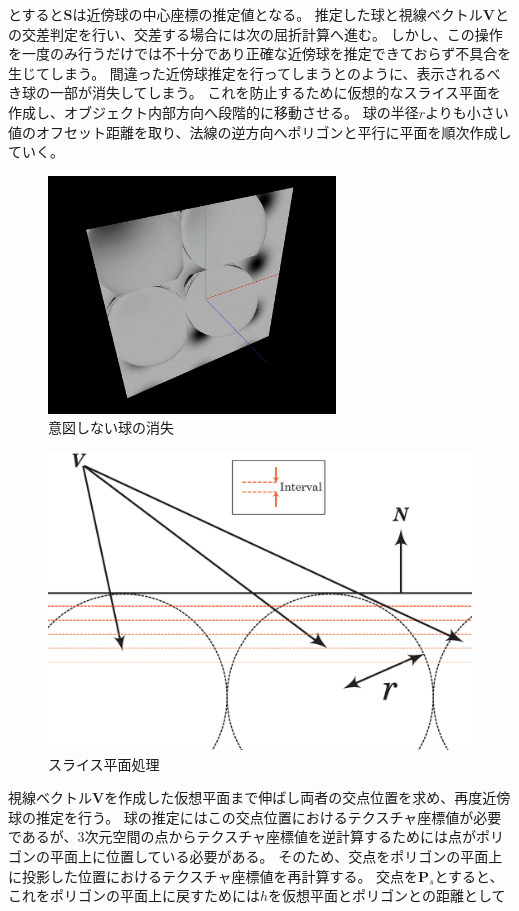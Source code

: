 \noindent
とすると$\bm{S}$は近傍球の中心座標の推定値となる。
推定した球と視線ベクトル$\bm{V}$との交差判定を行い、交差する場合には次の屈折計算へ進む。
しかし、この操作を一度のみ行うだけでは不十分であり正確な近傍球を推定できておらず不具合を生じてしまう。
間違った近傍球推定を行ってしまうとのように、表示されるべき球の一部が消失してしまう。
これを防止するために仮想的なスライス平面を作成し、オブジェクト内部方向へ段階的に移動させる。
球の半径$r$よりも小さい値のオフセット距離を取り、法線の逆方向へポリゴンと平行に平面を順次作成していく。

\begin{figure}[htbp]
  \centering
  \includegraphics[width=3.0in]{./img/four_sphere_negative.png}
  \caption{意図しない球の消失}
  \label{FFourSphereNegative}
\end{figure}
\begin{figure}[htbp]
  \centering
  \includegraphics[width=4.5in]{./img/find_first_sphere2.eps}
  \caption{スライス平面処理}
  \label{FFindFirstSphere}
\end{figure}


視線ベクトル$\bm{V}$を作成した仮想平面まで伸ばし両者の交点位置を求め、再度近傍球の推定を行う。
球の推定にはこの交点位置におけるテクスチャ座標値が必要であるが、3次元空間の点からテクスチャ座標値を逆計算するためには点がポリゴンの平面上に位置している必要がある。
そのため、交点をポリゴンの平面上に投影した位置におけるテクスチャ座標値を再計算する。
交点を$\bm{P}_s$とすると、これをポリゴンの平面上に戻すためには$h$を仮想平面とポリゴンとの距離として

